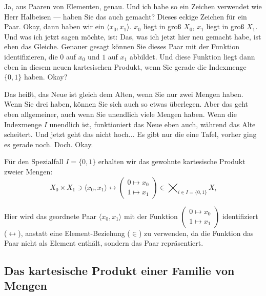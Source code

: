 \begin{spoken-clean}[continued]
Ja, aus Paaren von Elementen, genau. Und ich habe so ein Zeichen verwendet wie Herr Halbeisen --- haben Sie das auch gemacht? Dieses eckige Zeichen für ein Paar. Okay, dann haben wir ein $\langle x_0, x_1 \rangle$. $x_0$ liegt in groß $X_0$, $x_1$ liegt in groß $X_1$. Und was ich jetzt sagen möchte, ist: Das, was ich jetzt hier neu gemacht habe, ist eben das Gleiche. Genauer gesagt können Sie dieses Paar mit der Funktion identifizieren, die $0$ auf $x_0$ und $1$ auf $x_1$ abbildet. Und diese Funktion liegt dann eben in diesem neuen kartesischen Produkt, wenn Sie gerade die Indexmenge $\{0, 1\}$ haben. Okay?

Das heißt, das Neue ist gleich dem Alten, wenn Sie nur zwei Mengen haben. Wenn Sie drei haben, können Sie sich auch so etwas überlegen. Aber das geht eben allgemeiner, auch wenn Sie unendlich viele Mengen haben. Wenn die Indexmenge $I$ unendlich ist, funktioniert das Neue eben auch, während das Alte scheitert. Und jetzt geht das nicht hoch... Es gibt nur die eine Tafel, vorher ging es gerade noch. Doch. Okay.
\end{spoken-clean}

\begin{math-stroke}
Für den Spezialfall $I = \{0, 1\}$ erhalten wir das gewohnte kartesische Produkt zweier Mengen:
\[
X_0 \times X_1 \ni \langle x_0, x_1 \rangle \leftrightarrow \begin{pmatrix} 0 \mapsto x_0 \\ 1 \mapsto x_1 \end{pmatrix} \in \bigtimes_{i \in I=\{0,1\}} X_i
\]
\begin{ai-note}
Hier wird das geordnete Paar $\langle x_0, x_1 \rangle$ mit der Funktion $\begin{pmatrix} 0 \mapsto x_0 \\ 1 \mapsto x_1 \end{pmatrix}$ identifiziert ($\leftrightarrow$), anstatt eine Element-Beziehung ($\in$) zu verwenden, da die Funktion das Paar nicht als Element enthält, sondern das Paar repräsentiert.
\end{ai-note}
\end{math-stroke}

\subsection{Das kartesische Produkt einer Familie von Mengen}

